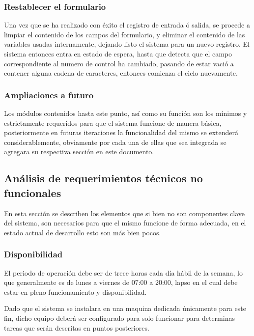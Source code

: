 \documentclass[12pt]{article} %
\begin{document}
		\subsubsection{Restablecer el formulario}
		
			Una vez que se ha realizado con \'exito el registro de entrada \'o salida, se procede a limpiar el contenido de los campos del formulario, y eliminar el contenido de 
			las variables usadas internamente, dejando listo el sistema para un nuevo registro.
			El sistema entonces entra en estado de espera, hasta que detecta que el campo correspondiente al numero de control ha cambiado, pasando de estar vació a contener 
			alguna cadena de caracteres, entonces comienza el ciclo nuevamente.

		\subsubsection{Ampliaciones a futuro}
			Los módulos contenidos hasta este punto, as\'i como su función son los mínimos y estrictamente requeridos para que el sistema funcione de manera básica, 
			posteriormente en futuras iteraciones la funcionalidad del mismo se extenderá considerablemente, obviamente por cada una de ellas que sea integrada se agregara su
			respectiva sección en este documento. 


		
  \subsection[Requerimientos no Funcionales]{An\'alisis de requerimientos t\'ecnicos no funcionales}
  		En esta sección se describen los elementos que si bien no son componentes clave del sistema, son necesarios para que el mismo funcione de forma adecuada, en el estado
  		actual de desarrollo esto son m\'as bien pocos.
  		
		\subsubsection{Disponibilidad}
			El periodo de operación debe ser de trece horas cada día hábil de la semana, lo que generalmente es de lunes a viernes de \textsc{07:00} a \textsc{20:00}, lapso 
			en el cual debe estar en pleno funcionamiento y disponibilidad.
			
			Dado que el sistema se instalara en una maquina dedicada únicamente para este fin, dicho equipo deberá ser configurado para solo funcionar para determinas tareas
			que serán descritas en puntos posteriores.
			
\end{document}
